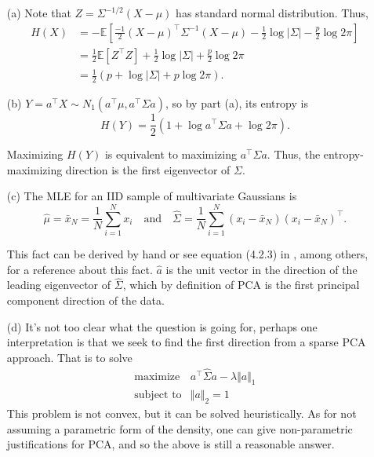 \begin{enumerate}
\item[(a)] Note that $Z=\Sigma^{-1/2}(X-\mu)$ has standard normal distribution. Thus,
\begin{align*}
H(X)
&= -\mathbb E\left[\frac{-1}{2}(X-\mu)^\top \Sigma^{-1}(X-\mu) - \frac{1}{2}\log|\Sigma| - \frac{p}{2}\log 2\pi\right]  \\
&= \frac{1}{2}\mathbb E \left[ Z^\top Z \right] + \frac{1}{2}\log|\Sigma| + \frac{p}{2}\log 2\pi\\
&= \frac{1}{2} \left( p + \log|\Sigma| + p \log 2\pi \right).
\end{align*}

\item[(b)] $Y = a^\top X \sim N_1(a^\top \mu,a^\top \Sigma a)$, so by part (a), its entropy is
\[ H(Y) = \frac{1}{2}(1+\log a^\top \Sigma a + \log 2\pi). \]

Maximizing $H(Y)$ is equivalent to maximizing $a^\top \Sigma a$. Thus, the entropy-maximizing direction is the first eigenvector of $\Sigma$.

\item[(c)] The MLE for an IID sample of multivariate Gaussians is $$\hat{\mu} =\bar{x}_N = \frac{1}{N} \sum_{i=1}^N x_i \quad  \text{and} \quad \widehat\Sigma = \frac{1}{N} \sum_{i=1}^N (x_i -\bar{x}_N) (x_i -\bar{x}_N)^\top.$$ 

This fact can be derived by hand or see equation (4.2.3) in \cite{Mardia1979}, among others, for a reference about this fact. $\hat a$ is the unit vector in the direction of the leading eigenvector of $\widehat\Sigma$, which by definition of PCA is the first principal component direction of the data.

\item[(d)] It's not too clear what the question is going for, perhaps one interpretation is that we seek to find the first direction from a sparse PCA approach. That is to solve 
\[\begin{array}{ll}
  \mbox{maximize} & a^\top \widehat{\Sigma} a - \lambda \Vert a \Vert_1 \\
  \mbox{subject to} & \Vert a \Vert_2 = 1
\end{array} \]
This problem is not convex, but it can be solved heuristically. As for not assuming a parametric form of the density, one can give non-parametric justifications for PCA, and so the above is still a reasonable answer.


\end{enumerate}

